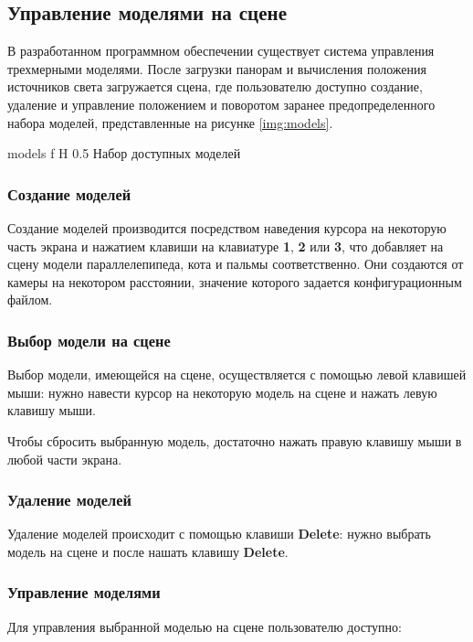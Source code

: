 \subsection{Управление моделями на сцене}

В разработанном программном обеспечении существует система управления трехмерными моделями. После загрузки панорам и вычисления положения источников света загружается сцена, где пользователю доступно создание, удаление и управление положением и поворотом заранее предопределенного набора моделей, представленные на рисунке \ref{img:models}. 

{models}
{f}
{H}
{0.5\textwidth}
{Набор доступных моделей}

\subsubsection*{Создание моделей}

Создание моделей производится посредством наведения курсора на некоторую часть экрана и нажатием клавиши на клавиатуре \textbf{1}, \textbf{2} или \textbf{3}, что добавляет на сцену модели параллелепипеда, кота и пальмы соответственно. Они создаются от камеры на некотором расстоянии, значение которого задается конфигурационным файлом.

\subsubsection*{Выбор модели на сцене}

Выбор модели, имеющейся на сцене, осуществляется с помощью левой клавишей мыши: нужно навести курсор на некоторую модель на сцене и нажать левую клавишу мыши. 

Чтобы сбросить выбранную модель, достаточно нажать правую клавишу мыши в любой части экрана.

\subsubsection*{Удаление моделей}

Удаление моделей происходит с помощью клавиши \textbf{Delete}: нужно выбрать модель на сцене и после нашать клавишу \textbf{Delete}.

\subsubsection*{Управление моделями}

Для управления выбранной моделью на сцене пользователю доступно:

